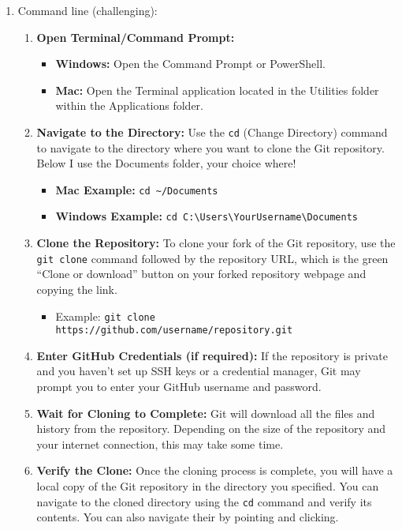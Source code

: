 \documentclass[12pt,english]{exam}
\begin{document}
\begin{questions}
\begin{enumerate}
  \item Command line (challenging):
  \begin{enumerate}
    \item \textbf{Open Terminal/Command Prompt:}
      \begin{itemize}
        \item \textbf{Windows:} Open the Command Prompt or PowerShell.
        \item \textbf{Mac:} Open the Terminal application located in the Utilities folder within the Applications folder.
      \end{itemize}
  \item \textbf{Navigate to the Directory:}
      Use the \texttt{cd} (Change Directory) command to navigate to the directory where you want to clone the Git repository. Below I use the Documents folder, your choice where! 
      \begin{itemize}
        \item \textbf{Mac Example:} \texttt{cd \textasciitilde/Documents}
        \item \textbf{Windows Example:} \texttt{cd C:\textbackslash Users\textbackslash YourUsername\textbackslash Documents}
      \end{itemize}
  \item \textbf{Clone the Repository:}
      To clone your fork of the Git repository, use the \texttt{git clone} command followed by the repository URL, which is the green ``Clone or download'' button on your forked repository webpage and copying the link.
      \begin{itemize}
      \item Example: \texttt{git clone https://github.com/username/repository.git}
      \end{itemize}

  \item \textbf{Enter GitHub Credentials (if required):}
      If the repository is private and you haven't set up SSH keys or a credential manager, Git may prompt you to enter your GitHub username and password.

  \item \textbf{Wait for Cloning to Complete:}
      Git will download all the files and history from the repository. Depending on the size of the repository and your internet connection, this may take some time.

  \item \textbf{Verify the Clone:}
      Once the cloning process is complete, you will have a local copy of the Git repository in the directory you specified. You can navigate to the cloned directory using the \texttt{cd} command and verify its contents. You can also navigate their by pointing and clicking. 
  \end{enumerate}
\end{enumerate}


\end{questions}
\end{document}
